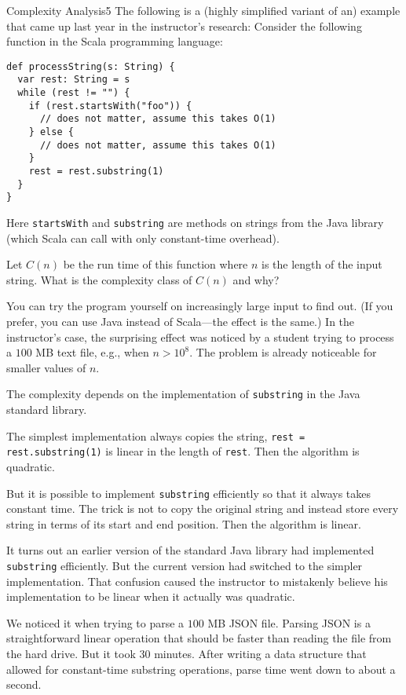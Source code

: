\documentclass[a4paper]{article}
\begin{document}
\begin{problem}{Complexity Analysis}{5}
The following is a (highly simplified variant of an) example that came up last year in the instructor's research:
Consider the following function in the Scala programming language:

\begin{lstlisting}
def processString(s: String) {
  var rest: String = s
  while (rest != "") {
    if (rest.startsWith("foo")) {
      // does not matter, assume this takes O(1)
    } else {
      // does not matter, assume this takes O(1)
    }
    rest = rest.substring(1)
  }
}
\end{lstlisting}
Here \lstinline|startsWith| and \lstinline|substring| are methods on strings from the Java library (which Scala can call with only constant-time overhead).

Let $C(n)$ be the run time of this function where $n$ is the length of the input string.
What is the complexity class of $C(n)$ and why?

You can try the program yourself on increasingly large input to find out. (If you prefer, you can use Java instead of Scala---the effect is the same.)
In the instructor's case, the surprising effect was noticed by a student trying to process a $100$ MB text file, e.g., when $n>10^8$. The problem is already noticeable for smaller values of $n$.

\begin{solution}
The complexity depends on the implementation of \lstinline|substring| in the Java standard library.

The simplest implementation always copies the string, \lstinline|rest = rest.substring(1)| is linear in the length of \lstinline|rest|.
Then the algorithm is quadratic.

But it is possible to implement \lstinline|substring| efficiently so that it always takes constant time.
The trick is not to copy the original string and instead store every string in terms of its start and end position.
Then the algorithm is linear.
\medskip

It turns out an earlier version of the standard Java library had implemented \lstinline|substring| efficiently.
But the current version had switched to the simpler implementation.
That confusion caused the instructor to mistakenly believe his implementation to be linear when it actually was quadratic.

We noticed it when trying to parse a $100$ MB JSON file.
Parsing JSON is a straightforward linear operation that should be faster than reading the file from the hard drive.
But it took $30$ minutes.
After writing a data structure that allowed for constant-time substring operations, parse time went down to about a second.
\end{solution}

\end{problem}
\end{document}
